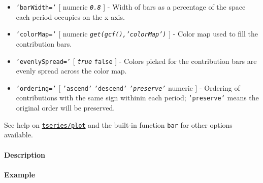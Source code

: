 \begin{itemize}
\item
  \texttt{'barWidth='} {[} numeric \textbar{} \emph{\texttt{0.8}} {]} -
  Width of bars as a percentage of the space each period occupies on the
  x-axis.
\item
  \texttt{'colorMap='} {[} numeric \textbar{}
  \emph{\texttt{get(gcf(),'colorMap')}} {]} - Color map used to fill the
  contribution bars.
\item
  \texttt{'evenlySpread='} {[} \emph{\texttt{true}} \textbar{}
  \texttt{false} {]} - Colors picked for the contribution bars are
  evenly spread across the color map.
\item
  \texttt{'ordering='} {[} \texttt{'ascend'} \textbar{}
  \texttt{'descend'} \textbar{} \emph{\texttt{'preserve'}} \textbar{}
  numeric {]} - Ordering of contributions with the same sign withinin
  each period; \texttt{'preserve'} means the original order will be
  preserved.
\end{itemize}

See help on \href{tseries/plot}{\texttt{tseries/plot}} and the built-in
function \texttt{bar} for other options available.

\paragraph{Description}

\paragraph{Example}


